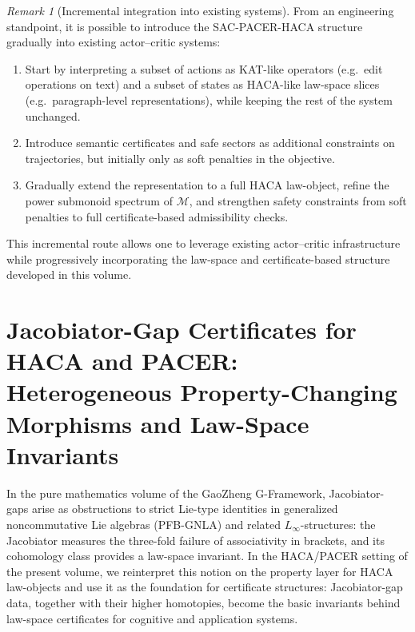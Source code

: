 \documentclass[11pt]{book}
\theoremstyle{plain}
\theoremstyle{definition}
\theoremstyle{remark}
\newtheorem{remark}[theorem]{Remark}
\begin{document}
\begin{remark}[Incremental integration into existing systems]
\label{rem:incremental-integration}
From an engineering standpoint, it is possible to introduce the
SAC-PACER-HACA structure gradually into existing actor–critic systems:
\begin{enumerate}
  \item Start by interpreting a subset of actions as KAT-like
        operators (e.g.\ edit operations on text) and a subset of
        states as HACA-like law-space slices (e.g.\ paragraph-level
        representations), while keeping the rest of the system
        unchanged.
  \item Introduce semantic certificates and safe sectors as additional
        constraints on trajectories, but initially only as soft
        penalties in the objective.
  \item Gradually extend the representation to a full HACA law-object,
        refine the power submonoid spectrum of $\mathcal{M}$, and
        strengthen safety constraints from soft penalties to full
        certificate-based admissibility checks.
\end{enumerate}
This incremental route allows one to leverage existing actor–critic
infrastructure while progressively incorporating the law-space and
certificate-based structure developed in this volume.
\end{remark}



\chapter[Jacobiator-Gap Certificates for HACA and PACER]{Jacobiator-Gap Certificates for HACA and PACER:\\
         Heterogeneous Property-Changing Morphisms and Law-Space Invariants}


In the pure mathematics volume of the GaoZheng G-Framework, Jacobiator-
gaps arise as obstructions to strict Lie-type identities in generalized
noncommutative Lie algebras (PFB-GNLA) and related $L_\infty$-structures:
the Jacobiator measures the three-fold failure of associativity in
brackets, and its cohomology class provides a law-space invariant.
In the HACA/PACER setting of the present volume, we reinterpret this
notion on the property layer for HACA law-objects and use it as the
foundation for certificate structures: Jacobiator-gap data, together
with their higher homotopies, become the basic invariants behind
law-space certificates for cognitive and application systems.
\end{document}

